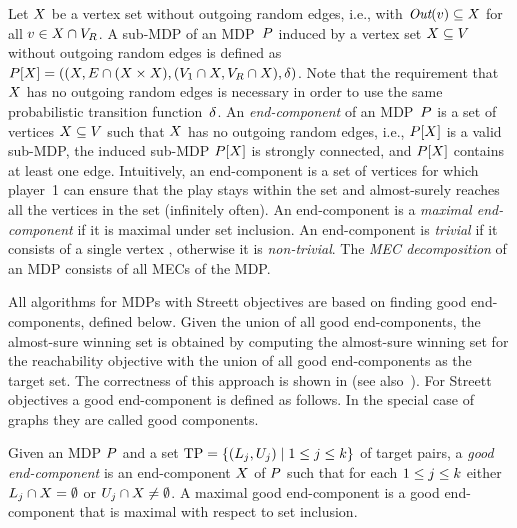\vspace{-0.5mm}
\smallskip{}
Let $X$ be a vertex set without outgoing random edges, i.e.,
with $\operatorname{\textit{Out}}(v) \subseteq X$ for all $v \in X \cap V_R$.
A sub-MDP of an MDP~$P$ induced by a vertex set $X \subseteq V$
without outgoing random edges is defined as 
$P[X] = ((X, E \cap (X \times X), (V_1 \cap X, 
V_R \cap X), \delta)$. Note that the requirement that $X$ has
no outgoing random edges
is necessary in order to use the same probabilistic transition function~$\delta$.
An \emph{end-component}  of an MDP~$P$ is a set of 
vertices $X \subseteq V$ such that  $X$ has no outgoing random 
edges, i.e., $P[X]$ is a valid sub-MDP,  the induced sub-MDP $P[X]$
is strongly connected, and  $P[X]$ contains at least one edge.
Intuitively, an end-component is a set of vertices for which player~1 can ensure
that the play stays within the set and almost-surely reaches all the vertices in the 
set (infinitely often). An end-component is a \emph{maximal end-component}  
if it is maximal under set inclusion.
An end-component is \emph{trivial} if it consists of a single vertex , otherwise it is \emph{non-trivial}.
The \emph{MEC decomposition} of an MDP consists of all MECs of the MDP.

\vspace{-0.5mm}
\smallskip{}
All algorithms for MDPs with Streett objectives are based on finding 
good end-components, defined below. Given the union of all good end-components, the 
almost-sure winning set is obtained by computing the 
almost-sure winning set for the reachability objective
with the union of all good end-components as the target set.
The correctness of this approach is shown in \cite{ChatterjeeDHL16,Loitzenbauer16}
(see also~\cite[Chap.~10.6.3]{baierbook}). For Streett objectives a good end-component
is defined as follows. In the special case of graphs they are called good components.

\begin{dfn}
	Given an MDP $P$ and a set $\mathrm{TP}= \{(L_j, U_j) \mid 1 \le j \le k\}$ of
	target pairs, a \emph{good end-component} is an 
	end-component $X$ of $P$ such that for each $1 \le j \le k$ either 
	$L_j \cap X = \emptyset$ or $U_j \cap X \ne \emptyset$.
	A maximal good end-component is a good end-component that is maximal with respect to set inclusion.
\end{dfn}

